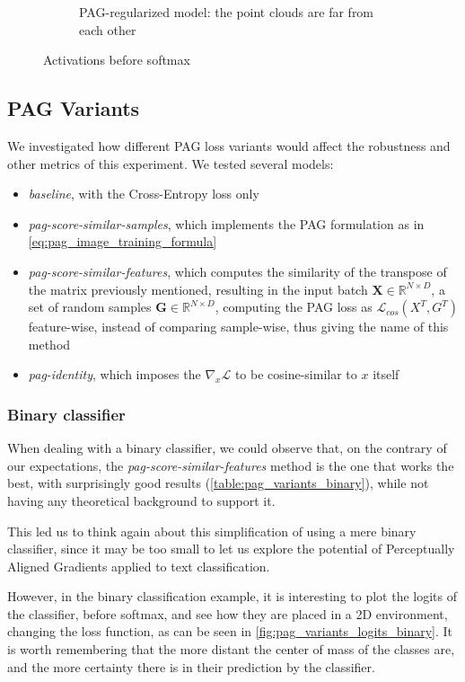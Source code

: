 \documentclass[../thesis.tex]{subfiles}
\begin{document}
\begin{figure}
\begin{subfigure}{0.48\linewidth}
        \caption{PAG-regularized model: the point clouds are far from each other}
    \end{subfigure}
    \caption{Activations before softmax}
    \label{fig:pag_pre_softmax_activations}
\end{figure}

\subsection{PAG Variants}
\label{sec:pag__pag_variants_strategies}
We investigated how different PAG loss variants would affect the robustness and other metrics of this experiment.
We tested several models:
\begin{itemize}
    \item \emph{baseline}, with the Cross-Entropy loss only
    \item \emph{pag-score-similar-samples}, which implements the PAG formulation as in \cref{eq:pag_image_training_formula}
    \item \emph{pag-score-similar-features}, which computes the similarity of the transpose of the matrix previously mentioned, resulting in the input batch $\mathbf{X} \in \mathbb{R}^{N \times D}$, a set of random samples $\mathbf{G} \in \mathbb{R}^{N \times D}$, computing the PAG loss as $\mathcal{L}_{cos}(X^T, G^T)$ feature-wise, instead of comparing sample-wise, thus giving the name of this method
    \item \emph{pag-identity}, which imposes the $\nabla_x \mathcal{L}$ to be cosine-similar to $x$ itself
\end{itemize}

\subsubsection{Binary classifier}
When dealing with a binary classifier, we could observe that, on the contrary of our expectations,
the \emph{pag-score-similar-features} method is the one that works the best, with surprisingly good results (\cref{table:pag_variants_binary}), while not having any theoretical background to support it.

This led us to think again about this simplification of using a mere binary classifier, since it may be too small to let us explore the potential of Perceptually Aligned Gradients applied to text classification.

However, in the binary classification example, it is interesting to plot the logits of the classifier, before softmax, and see how they are placed in a 2D environment, changing the loss function, as can be seen in \cref{fig:pag_variants_logits_binary}.
It is worth remembering that the more distant the center of mass of the classes are, and the more certainty there is in their prediction by the classifier.
\end{document}
